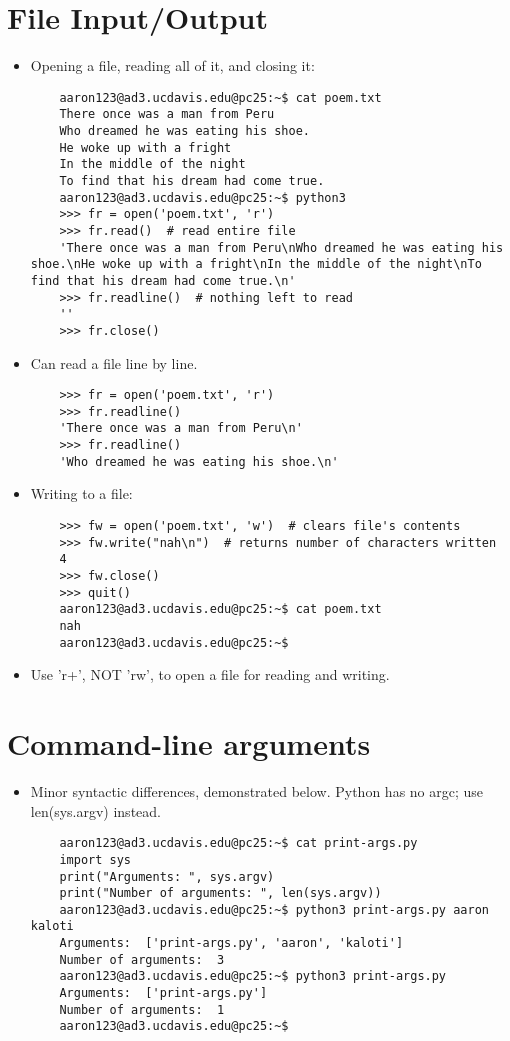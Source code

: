 \documentclass{article}
\begin{document}
\section{File Input/Output}
\begin{itemize}
    \item Opening a file, reading all of it, and closing it:
    \begin{lstlisting}
    aaron123@ad3.ucdavis.edu@pc25:~$ cat poem.txt
    There once was a man from Peru
    Who dreamed he was eating his shoe.
    He woke up with a fright
    In the middle of the night
    To find that his dream had come true.
    aaron123@ad3.ucdavis.edu@pc25:~$ python3
    >>> fr = open('poem.txt', 'r')
    >>> fr.read()  # read entire file
    'There once was a man from Peru\nWho dreamed he was eating his shoe.\nHe woke up with a fright\nIn the middle of the night\nTo find that his dream had come true.\n'
    >>> fr.readline()  # nothing left to read
    ''
    >>> fr.close()
    \end{lstlisting}
    \item Can read a file line by line.
    \begin{lstlisting}
    >>> fr = open('poem.txt', 'r')
    >>> fr.readline()
    'There once was a man from Peru\n'
    >>> fr.readline()
    'Who dreamed he was eating his shoe.\n'
    \end{lstlisting}
    \item Writing to a file:
    \begin{lstlisting}
    >>> fw = open('poem.txt', 'w')  # clears file's contents
    >>> fw.write("nah\n")  # returns number of characters written
    4
    >>> fw.close()
    >>> quit()
    aaron123@ad3.ucdavis.edu@pc25:~$ cat poem.txt
    nah
    aaron123@ad3.ucdavis.edu@pc25:~$
    \end{lstlisting}
    \item Use 'r+', NOT 'rw', to open a file for reading and writing.
\end{itemize}

\section{Command-line arguments}
\begin{itemize}
    \item Minor syntactic differences, demonstrated below. Python has no argc; use len(sys.argv) instead.
    \begin{lstlisting}
    aaron123@ad3.ucdavis.edu@pc25:~$ cat print-args.py
    import sys
    print("Arguments: ", sys.argv)
    print("Number of arguments: ", len(sys.argv))
    aaron123@ad3.ucdavis.edu@pc25:~$ python3 print-args.py aaron kaloti
    Arguments:  ['print-args.py', 'aaron', 'kaloti']
    Number of arguments:  3
    aaron123@ad3.ucdavis.edu@pc25:~$ python3 print-args.py
    Arguments:  ['print-args.py']
    Number of arguments:  1
    aaron123@ad3.ucdavis.edu@pc25:~$
    \end{lstlisting}
\end{itemize}
\end{document}
